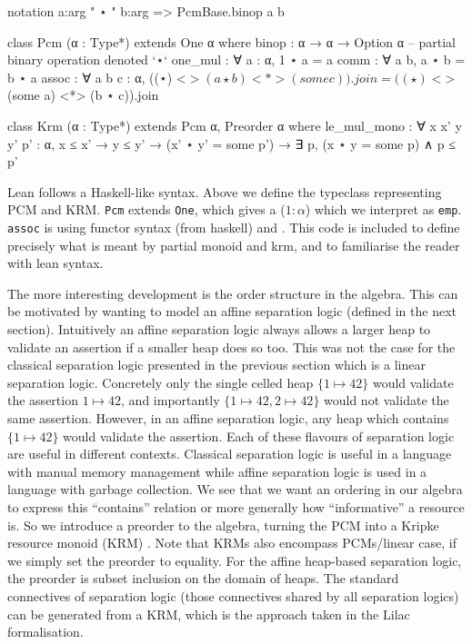 \begin{leancode}
notation a:arg " ⋆ " b:arg => PcmBase.binop a b

class Pcm (α : Type*) extends One α where
  binop : α → α → Option α -- partial binary operation denoted `⋆`
  one_mul : ∀ a : α, 1 ⋆ a = a
  comm : ∀ a b, a ⋆ b = b ⋆ a
  assoc : ∀ a b c : α,
    ((⋆) <$> (a ⋆ b) <*> (some c)).join = ((⋆) <$> (some a) <*> (b ⋆ c)).join

class Krm (α : Type*) extends Pcm α, Preorder α where
  le_mul_mono : ∀ x x' y y' p' : α,
    x ≤ x' → y ≤ y' →
    (x' ⋆ y' = some p') → ∃ p, (x ⋆ y = some p) ∧ p ≤ p'
\end{leancode}

Lean follows a Haskell-like syntax. Above we define the typeclass representing PCM and KRM.
\texttt{Pcm} extends \texttt{One}, which gives a ($1 : \alpha$) which we interpret as \texttt{emp}.
\texttt{assoc} is using functor syntax (from haskell) and .
This code is included to define precisely what is meant by partial monoid and krm, and to
familiarise the reader with lean syntax. 

The more interesting development is the order structure in the algebra. This can be motivated by wanting to model an affine separation logic (defined in the next section).
Intuitively an affine separation logic always allows a larger heap to validate an assertion if a smaller heap does so too. This was not the case for the classical
separation logic presented in the previous section which is a linear separation logic. Concretely only the single celled heap $\{1 \mapsto 42\}$ would validate the assertion $1 \mapsto 42$,
and importantly $\{1 \mapsto 42, 2 \mapsto 42\}$ would not validate the same assertion. However, in an affine separation logic, any heap which contains $\{1 \mapsto 42\}$ would validate the assertion.
Each of these flavours of separation logic are useful in different contexts. Classical separation logic is useful in a language with manual memory management while
affine separation logic is used in a language with garbage collection.
We see that we want an ordering in our algebra to express this ``contains'' relation or more generally how ``informative'' a resource is. So we introduce a preorder
to the algebra, turning the PCM into a Kripke resource monoid (KRM) \citep{galmiche}. Note that KRMs also encompass PCMs/linear case, if we simply set the preorder to equality.
For the affine heap-based separation logic, the preorder is subset inclusion on the domain of heaps. The standard connectives of separation logic
(those connectives shared by all separation logics)
can be
generated from a KRM, which is the approach taken in the Lilac formalisation.

